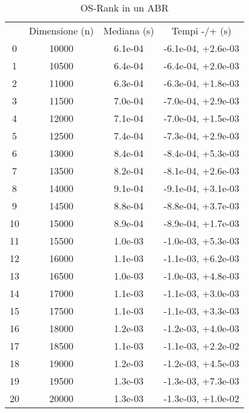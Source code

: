 \begin{table}
\centering
\caption{OS-Rank in un ABR}
\label{OS-Rank in un ABR}
\begin{adjustbox}{width=1\textwidth/2}
\begin{tabular}{|c|c|c|c|}
\hline
 & Dimensione (n) & Mediana (s) & Tempi -/+ (s) \\
0 & 10000 & 6.1e-04 & -6.1e-04, +2.6e-03 \\
\cline{1-4}
1 & 10500 & 6.4e-04 & -6.4e-04, +2.0e-03 \\
\cline{1-4}
2 & 11000 & 6.3e-04 & -6.3e-04, +1.8e-03 \\
\cline{1-4}
3 & 11500 & 7.0e-04 & -7.0e-04, +2.9e-03 \\
\cline{1-4}
4 & 12000 & 7.1e-04 & -7.0e-04, +1.5e-03 \\
\cline{1-4}
5 & 12500 & 7.4e-04 & -7.3e-04, +2.9e-03 \\
\cline{1-4}
6 & 13000 & 8.4e-04 & -8.4e-04, +5.3e-03 \\
\cline{1-4}
7 & 13500 & 8.2e-04 & -8.1e-04, +2.6e-03 \\
\cline{1-4}
8 & 14000 & 9.1e-04 & -9.1e-04, +3.1e-03 \\
\cline{1-4}
9 & 14500 & 8.8e-04 & -8.8e-04, +3.7e-03 \\
\cline{1-4}
10 & 15000 & 8.9e-04 & -8.9e-04, +1.7e-03 \\
\cline{1-4}
11 & 15500 & 1.0e-03 & -1.0e-03, +5.3e-03 \\
\cline{1-4}
12 & 16000 & 1.1e-03 & -1.1e-03, +6.2e-03 \\
\cline{1-4}
13 & 16500 & 1.0e-03 & -1.0e-03, +4.8e-03 \\
\cline{1-4}
14 & 17000 & 1.1e-03 & -1.1e-03, +3.0e-03 \\
\cline{1-4}
15 & 17500 & 1.1e-03 & -1.1e-03, +3.3e-03 \\
\cline{1-4}
16 & 18000 & 1.2e-03 & -1.2e-03, +4.0e-03 \\
\cline{1-4}
17 & 18500 & 1.1e-03 & -1.1e-03, +2.2e-02 \\
\cline{1-4}
18 & 19000 & 1.2e-03 & -1.2e-03, +4.5e-03 \\
\cline{1-4}
19 & 19500 & 1.3e-03 & -1.3e-03, +7.3e-03 \\
\cline{1-4}
20 & 20000 & 1.3e-03 & -1.3e-03, +1.0e-02 \\
\cline{1-4}
\end{tabular}
\end{adjustbox}
\end{table}
